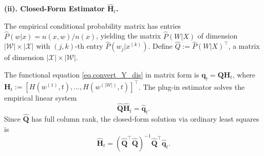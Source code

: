 \documentclass[
  12pt]{article}
\def\H{\mathbf{H}}
\def\Q{\mathbf{Q}}
\def\q{\mathbf{q}}
\def\wh{\widehat}
\begin{document}
\noindent\textbf{(ii). Closed-Form Estimator $\wh{\H}_t$.}

The empirical conditional probability matrix has entries $\wh{P}(w | x) = n(x, w) / n(x)$, yielding the matrix $\wh{P}(W | X)$ of dimension $|\mathcal{W}| \times |\mathcal{X}|$ with $(j, k)$-th entry $\wh{P}(w_j | x^{(k)})$. Define $\wh{Q} := \wh{P}(W | X)^\top$, a matrix of dimension $|\mathcal{X}| \times |\mathcal{W}|$.

The functional equation \eqref{eq.convert_Y_dis} in matrix form is $\q_t = \Q \mathbf{H}_t$, where $\mathbf{H}_t := [H(w^{(1)}, t), ..., H(w^{(|\mathcal{W}|)}, t)]^\top$. The plug-in estimator solves the empirical linear system
$$
\wh{\Q} \wh{\mathbf{H}}_t = \wh{\q}_t.
$$
Since $\wh{\Q}$ has full column rank, the closed-form solution via ordinary least squares is
$$
\wh{\mathbf{H}}_t = (\wh{\Q}^\top \wh{\Q})^{-1} \wh{\Q}^\top \wh{\q}_t.
$$
\end{document}
